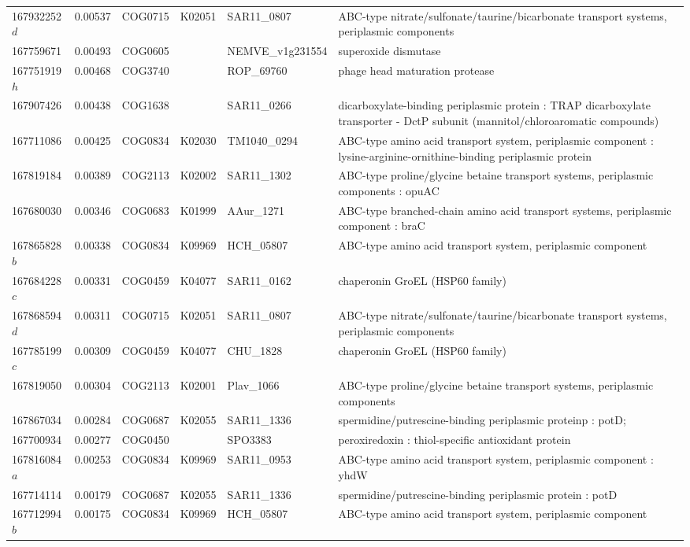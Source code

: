 \begin{landscape}
\begin{longtable}{p{1.8cm}p{0.9cm}p{2.2cm}p{1cm}p{2.8cm}p{13.4cm}}
167932252$d$&0.00537&COG0715&K02051&SAR11\_0807&ABC-type nitrate/sulfonate/taurine/bicarbonate transport systems, periplasmic components \\
167759671&0.00493&COG0605&&NEMVE\_v1g231554&superoxide dismutase \\
167751919$h$&0.00468&COG3740&&ROP\_69760&phage head maturation protease \\
167907426&0.00438&COG1638&&SAR11\_0266&dicarboxylate-binding periplasmic protein : TRAP dicarboxylate transporter - DctP subunit (mannitol/chloroaromatic compounds) \\
167711086&0.00425&COG0834&K02030&TM1040\_0294&ABC-type amino acid transport system, periplasmic component : lysine-arginine-ornithine-binding periplasmic protein \\
167819184&0.00389&COG2113&K02002&SAR11\_1302&ABC-type proline/glycine betaine transport systems, periplasmic components : opuAC \\
167680030&0.00346&COG0683&K01999&AAur\_1271&ABC-type branched-chain amino acid transport systems, periplasmic component : braC \\
167865828$b$&0.00338&COG0834&K09969&HCH\_05807&ABC-type amino acid transport system, periplasmic component \\
167684228$c$&0.00331&COG0459&K04077&SAR11\_0162&chaperonin GroEL (HSP60 family) \\
167868594$d$&0.00311&COG0715&K02051&SAR11\_0807&ABC-type nitrate/sulfonate/taurine/bicarbonate transport systems, periplasmic components \\
167785199$c$&0.00309&COG0459&K04077&CHU\_1828&chaperonin GroEL (HSP60 family) \\
167819050&0.00304&COG2113&K02001&Plav\_1066&ABC-type proline/glycine betaine transport systems, periplasmic components \\
167867034&0.00284&COG0687&K02055&SAR11\_1336&spermidine/putrescine-binding periplasmic proteinp : potD; \\
167700934&0.00277&COG0450&&SPO3383&peroxiredoxin : thiol-specific antioxidant protein \\
167816084$a$&0.00253&COG0834&K09969&SAR11\_0953&ABC-type amino acid transport system, periplasmic component : yhdW \\
167714114&0.00179&COG0687&K02055&SAR11\_1336&spermidine/putrescine-binding periplasmic protein : potD \\
167712994$b$&0.00175&COG0834&K09969&HCH\_05807&ABC-type amino acid transport system, periplasmic component \\

\end{longtable}
\end{landscape}
